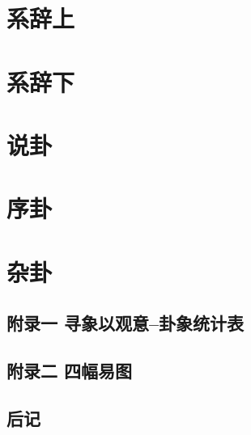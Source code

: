 \documentclass[12pt,UTF8]{ctexbook}
\begin{document}
\part{系辞上}
\part{系辞下}
\part{说卦}
\part{序卦}
\part{杂卦}

\backmatter
\chapter{附录一 寻象以观意--卦象统计表}
\chapter{附录二 四幅易图}
\chapter{后记}
\end{document}
